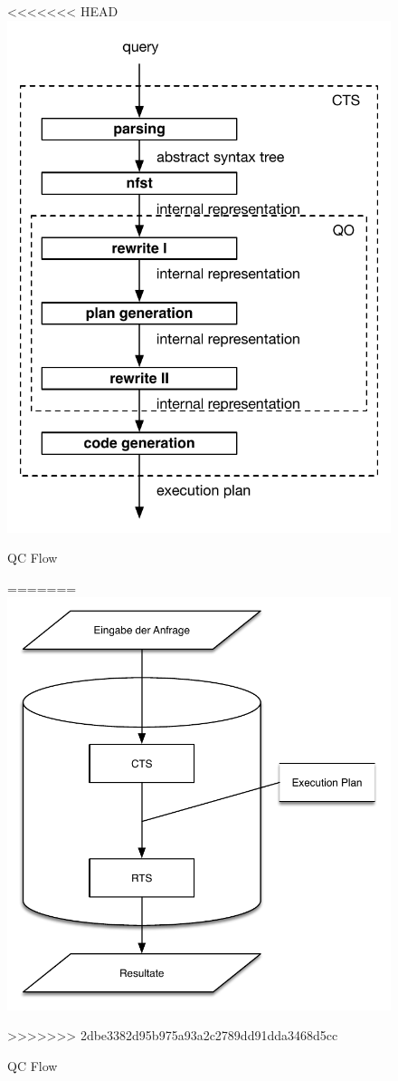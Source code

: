 \begin{figure}[h]
  \centering
<<<<<<< HEAD
  \includegraphics{02_Grundlagen/QCArchitecture.pdf}
  \caption{\ac{QC} Flow}
  \label{DBMS_Interpreter}
=======
  \includegraphics{02_Grundlagen/CTS_RTS.pdf}
  \caption{\ac{QC} Flow}
  \label{QC_Architecture}
>>>>>>> 2dbe3382d95b975a93a2c2789dd91dda3468d5cc
\end{figure}


